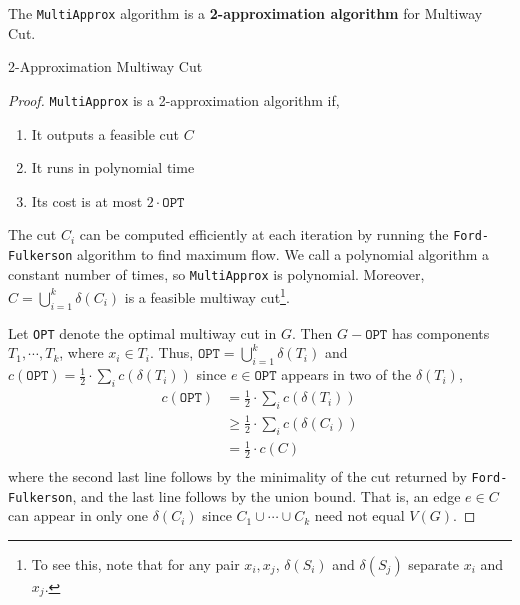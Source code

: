 \begin{thm}
	The \texttt{MultiApprox} algorithm is a \textbf{2-approximation algorithm} for Multiway Cut.
	\begin{algorithm}
	  \caption{2-Approximation Multiway Cut}\label{2approxMC}
	\end{algorithm}
\end{thm}

\begin{proof}
	\texttt{MultiApprox} is a 2-approximation algorithm if,
	\begin{enumerate}
		\item It outputs a feasible cut $C$
		\item It runs in polynomial time
		\item Its cost is at most $2 \cdot \texttt{OPT}$
	\end{enumerate}

	\noindent The cut $C_i$ can be computed efficiently at each iteration by running the \texttt{Ford-Fulkerson} algorithm to find maximum flow. We call a polynomial algorithm a constant number of times, so \texttt{MultiApprox} is polynomial. Moreover, $C = \bigcup_{i = 1}^k \delta(C_i)$ is a feasible multiway cut\footnote{To see this, note that for any pair $x_i, x_j$, $\delta(S_i)$ and $\delta(S_j)$ separate $x_i$ and $x_j$.}. 

	Let \texttt{OPT} denote the optimal multiway cut in $G$. Then $G - \texttt{OPT}$ has components $T_1, \cdots, T_k$, where $x_i \in T_i$. Thus, $\texttt{OPT} = \bigcup_{i = 1}^k \delta(T_i)$ and $c(\texttt{OPT}) = \frac{1}{2} \cdot \sum_i c(\delta(T_i))$ since $e \in \texttt{OPT}$ appears in two of the $\delta(T_i)$,
	\begin{align*}
		c(\texttt{OPT}) &= \frac{1}{2} \cdot \sum_i c(\delta(T_i)) \\
						&\geq \frac{1}{2} \cdot \sum_i c(\delta(C_i)) \\
						&= \frac{1}{2} \cdot c(C) \\
	\end{align*}
	where the second last line follows by the minimality of the cut returned by \texttt{Ford-Fulkerson}, and the last line follows by the union bound. That is, an edge $e \in C$ can appear in only one $\delta(C_i)$ since $C_1 \cup \cdots \cup C_k$ need not equal $V(G)$.
\end{proof}

